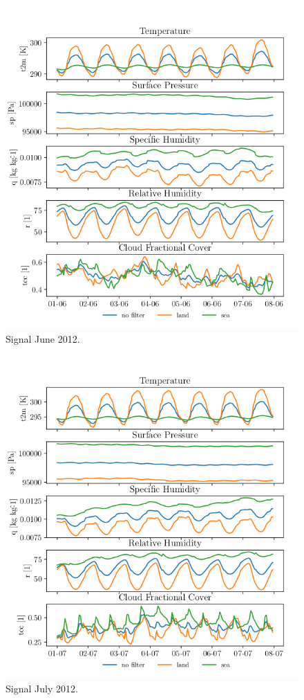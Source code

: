 \begin{figure}[ht]
    \centering
    \includegraphics{python_figs/spatially_averaged_one_week_from_2012-06-01.png}
    \caption{Signal June 2012.}
    \label{fig:jun12}
\end{figure}
\begin{figure}[ht]
    \centering
    \includegraphics{python_figs/spatially_averaged_one_week_from_2012-07-01.png}
    \caption{Signal July 2012.}
    \label{fig:jul12}
\end{figure}
